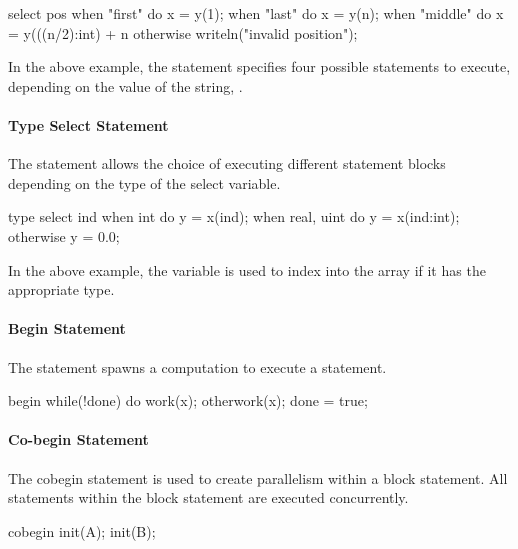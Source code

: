 \begin{example}
\begin{chapel}
select pos {
  when "first" do x = y(1);
  when "last" do x = y(n);
  when "middle" do x = y(((n/2):int) + n%
  otherwise writeln("invalid position");
}
\end{chapel}
In the above example, the  statement specifies
four possible statements to execute, depending on the value of
the string, .
\end{example}

\paragraph{Type Select Statement} 
The  statement allows the choice of
executing different statement blocks depending on the type
of the select variable.

\begin{example}
\begin{chapel}
type select ind {
  when int do y = x(ind);
  when real, uint do y = x(ind:int);
  otherwise y = 0.0;
}
\end{chapel}
In the above example, the variable  is used
to index into the array  if it has the appropriate
type.
\end{example}

\paragraph{Begin Statement} 
The  statement spawns a computation to execute a
statement.

\begin{example}
\begin{chapel}
begin {
  while(!done) do work(x);
}
otherwork(x);
done = true;
\end{chapel}
\end{example}

\paragraph{Co-begin Statement} 
The cobegin statement is used to create parallelism within
a block statement.  All statements within the block statement
are executed concurrently.

\begin{example}
\begin{chapel}
cobegin {
  init(A);
  init(B);
}
\end{chapel}
\end{example}


